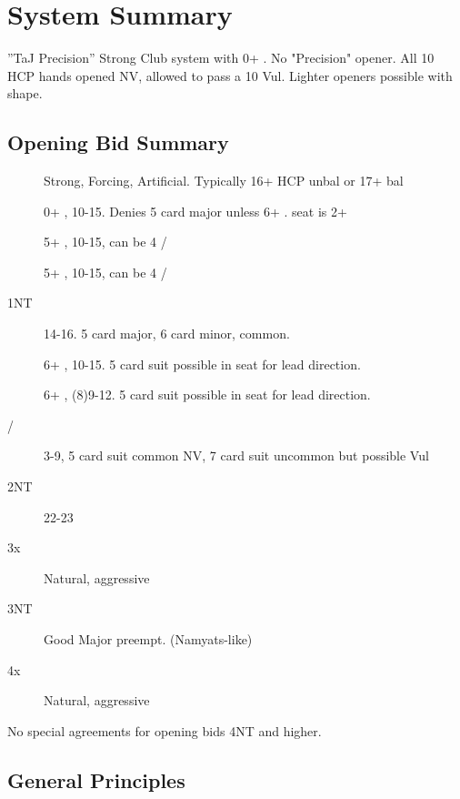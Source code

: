 \documentclass[tom-jenni]{subfile}
\begin{document}
	
\chapter{System Summary}


''TaJ Precision'' 
Strong Club system with 0+ .  No "Precision"  opener.  All 10 HCP hands opened NV, allowed to pass a 10 Vul. Lighter openers possible with shape.  

\section{Opening Bid Summary}

\begin{description}
	\item[] Strong, Forcing, Artificial.  Typically 16+ HCP unbal or 17+ bal
	\item[] 0+ \ddd, 10-15.  Denies 5 card major unless 6+ \ddd.  \third seat is 2+ \ddd
	\item[] 5+ \hhh, 10-15, can be 4 \third/\fourth
	\item[] 5+ \sss, 10-15, can be 4 \third/\fourth
	\item[1NT] 14-16.  5 card major, 6 card minor,  common.
	\item[] 6+ \ccc, 10-15.  5 card suit possible in \third seat for lead direction.
	\item[] 6+ \ddd, (8)9-12.  5 card suit possible in \third seat for lead direction.
	\item[/\sss] 3-9, 5 card suit common NV, 7 card suit uncommon but possible Vul
	\item[2NT] 22-23
	\item[3x] Natural, aggressive
	\item[3NT] Good Major preempt.  (Namyats-like)
	\item[4x] Natural, aggressive
\end{description}

No special agreements for opening bids 4NT and higher.

\section{General Principles}
\end{document}
